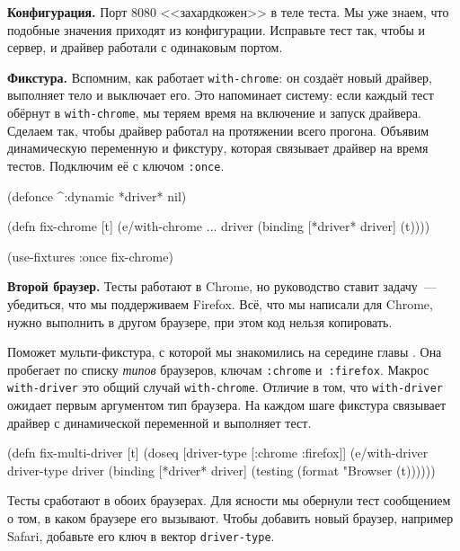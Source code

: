 \textbf{Конфигурация.} Порт 8080 <<захардкожен>> в теле теста. Мы уже знаем, что
подобные значения приходят из конфигурации. Исправьте тест так, чтобы и сервер,
и драйвер работали с одинаковым портом.


\textbf{Фикстура.} Вспомним, как работает \verb|with-chrome|: он создаёт новый
драйвер, выполняет тело и выключает его. Это напоминает систему: если каждый
тест обёрнут в \verb|with-chrome|, мы теряем время на включение и запуск
драйвера. Сделаем так, чтобы драйвер работал на протяжении всего
прогона. Объявим динамическую переменную и фикстуру, которая связывает драйвер
на время тестов. Подключим её с ключом \verb|:once|.

\begin{english}
  \begin{clojure}
(defonce ^:dynamic *driver* nil)

(defn fix-chrome [t]
  (e/with-chrome {...} driver
    (binding [*driver* driver]
      (t))))

(use-fixtures :once fix-chrome)
  \end{clojure}
\end{english}

\textbf{Второй браузер.} Тесты работают в Chrome, но руководство ставит
задачу~--- убедиться, что мы поддерживаем Firefox. Всё, что мы написали для
Chrome, нужно выполнить в другом браузере, при этом код нельзя копировать.

Поможет мульти-фикстура, с которой мы знакомились на середине
главы . Она пробегает по списку \emph{типов} браузеров,
ключам \verb|:chrome| и~\verb|:firefox|. Макрос \verb|with-driver| это общий
случай \verb|with-chrome|. Отличие в том, что \verb|with-driver| ожидает первым
аргументом тип браузера. На каждом шаге фикстура связывает драйвер с
динамической переменной и выполняет тест.

\begin{english}
  \begin{clojure}
(defn fix-multi-driver [t]
  (doseq [driver-type [:chrome :firefox]]
    (e/with-driver driver-type {} driver
      (binding [*driver* driver]
        (testing (format "Browser %
          (t))))))
  \end{clojure}
\end{english}

Тесты сработают в обоих браузерах. Для ясности мы обернули тест сообщением о
том, в каком браузере его вызывают. Чтобы добавить новый браузер, например
Safari, добавьте его ключ в вектор \verb|driver-type|.

